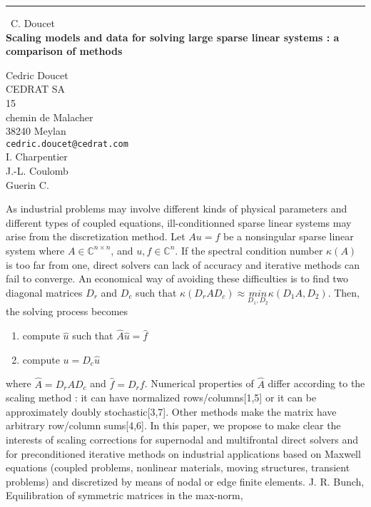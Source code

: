 \documentclass{report}
\begin{document}
\begin{center}
\rule{6in}{1pt} \
{\large C. Doucet \\
{\bf Scaling models and data for solving large sparse linear systems : a comparison of methods}}

Cedric Doucet \\ CEDRAT SA \\ 15 \\ chemin de Malacher \\ 38240 Meylan
\\
{\tt cedric.doucet@cedrat.com}\\
I. Charpentier\\
J.-L. Coulomb\\
	Guerin C.\end{center}

As industrial problems may involve different kinds of physical parameters
and different types of coupled equations, ill-conditionned sparse linear
systems may arise from the discretization method. Let $Au=f$ be a
nonsingular sparse linear system where $A\in \mathbb{C}^{n\times n}$, and
$u,f\in \mathbb{C}^n$. If the spectral condition number $\kappa(A)$ is
too far from one, direct solvers can lack of accuracy and iterative
methods can fail to converge. An economical way of avoiding these
difficulties is to find two diagonal matrices $D_r$ and $D_c$ such that
$\kappa(D_rAD_c) \approx \underset{D_1,D_2}{min}{\kappa(D_1A,D_2)}$.
Then, the solving process becomes
\begin{enumerate}
\item compute $\hat{u}$ such that $\hat{A}\hat{u}=\hat{f}$
\item compute $u = D_c\hat{u}$
\end{enumerate}
where $\hat{A}= D_rAD_c$ and $\hat{f}=D_rf$. Numerical properties of
$\hat{A}$ differ according to the scaling method : it can have normalized
rows/columns[1,5] or it can be approximately doubly stochastic[3,7].
Other methods make the matrix have arbitrary row/column sums[4,6]. In
this paper, we propose to make clear the interests of scaling corrections
for supernodal and multifrontal direct solvers and for preconditioned
iterative methods on industrial applications based on Maxwell equations
(coupled problems, nonlinear materials, moving structures, transient
problems) and discretized by means of nodal or edge finite elements.
\newline
\newline
{}
\newline
[1] J. R. Bunch, Equilibration of symmetric matrices in the max-norm,
\end{document}
